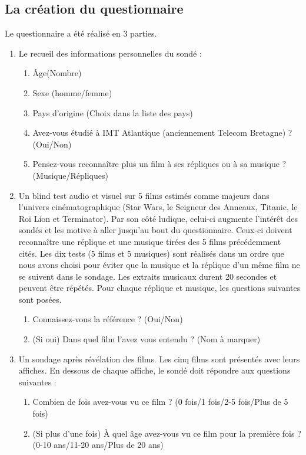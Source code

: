 \documentclass{article} %
\begin{document}
\subsection{La création du questionnaire }
Le questionnaire a été réalisé en 3 parties.
\begin{enumerate}
	\vspace{-0.2cm}
	\setlength\itemsep{0.0cm}
	\item Le recueil des informations personnelles du sondé :
	\begin{enumerate}
		\item Âge(Nombre)
		\item Sexe (homme/femme)
		\item Pays d’origine (Choix dans la liste des pays)
		\item Avez-vous étudié à IMT Atlantique (anciennement Telecom Bretagne) ? (Oui/Non)
		\item Pensez-vous reconnaître plus un film à ses répliques ou à sa musique ? (Musique/Répliques)
	\end{enumerate}
	\item Un blind test audio et visuel sur 5 films estimés comme majeurs dans l’univers cinématographique (Star Wars, le Seigneur des Anneaux, Titanic, le Roi Lion et Terminator). Par son côté ludique, celui-ci augmente l’intérêt des sondés et les motive à aller jusqu’au bout du questionnaire. Ceux-ci doivent reconnaître une réplique et une musique tirées des 5 films précédemment cités. Les dix tests (5 films et 5 musiques) sont réalisés dans un ordre que nous avons choisi pour éviter que la musique et la réplique d’un même film ne se suivent dans le sondage. Les extraits musicaux durent 20 secondes et peuvent être répétés. Pour chaque réplique et musique, les questions suivantes sont posées.
	\begin{enumerate}
		\item Connaissez-vous la référence ? (Oui/Non)
		\item (Si oui) Dans quel film l’avez vous entendu ? (Nom à marquer)
	\end{enumerate}
	\item Un sondage après révélation des films. Les cinq films sont présentés avec leurs affiches. En dessous de chaque affiche, le sondé doit répondre aux questions suivantes :
	\begin{enumerate}
		\item Combien de fois avez-vous vu ce film ? (0 fois/1 fois/2-5 fois/Plus de 5 fois)
		\item (Si plus d’une fois) À quel âge avez-vous vu ce film pour la première fois ? (0-10 ans/11-20 ans/Plus de 20 ans)

\end{enumerate}
\end{enumerate}
\end{document}

